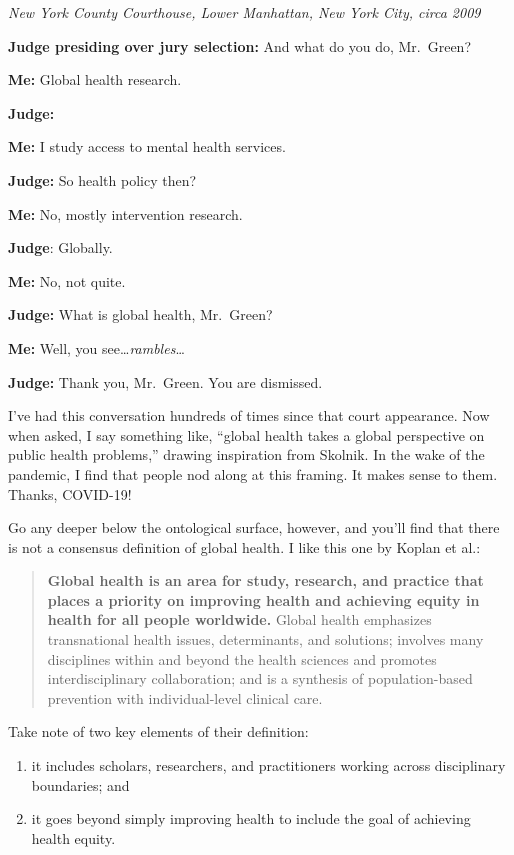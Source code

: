 \documentclass[justified,twoside,symmetric,]{tufte-book}
\providecommand{\tightlist}{%
  \setlength{\itemsep}{0pt}\setlength{\parskip}{0pt}}
\renewcommand*{\citep}[1]{{\cite{#1}}}
\begin{document}
\emph{New York County Courthouse, Lower Manhattan, New York City, circa 2009}

\textbf{Judge presiding over jury selection:} And what do you do, Mr.~Green?

\textbf{Me:} Global health research.

\textbf{Judge:}

\textbf{Me:} I study access to mental health services.

\textbf{Judge:} So health policy then?

\textbf{Me:} No, mostly intervention research.

\textbf{Judge}: Globally.

\textbf{Me:} No, not quite.

\textbf{Judge:} What is global health, Mr.~Green?

\textbf{Me:} Well, you see\ldots{}\emph{rambles}\ldots{}

\textbf{Judge:} Thank you, Mr.~Green. You are dismissed.

\vspace{2cm}

I've had this conversation hundreds of times since that court appearance. Now when asked, I say something like, ``global health takes a global perspective on public health problems,'' drawing inspiration from Skolnik.\citep{skolnik2019} In the wake of the pandemic, I find that people nod along at this framing. It makes sense to them. Thanks, COVID-19!

Go any deeper below the ontological surface, however, and you'll find that there is not a consensus definition of global health.\citep{merson:2018} I like this one by Koplan et al.\citep{koplan:2009}:

\begin{quote}
\textbf{Global health is an area for study, research, and practice that places a priority on improving health and achieving equity in health for all people worldwide.} Global health emphasizes transnational health issues, determinants, and solutions; involves many disciplines within and beyond the health sciences and promotes interdisciplinary collaboration; and is a synthesis of population-based prevention with individual-level clinical care.
\end{quote}

Take note of two key elements of their definition:

\begin{enumerate}
\def\labelenumi{\arabic{enumi}.}
\tightlist
\item
  it includes scholars, researchers, and practitioners working across disciplinary boundaries; and
\item
  it goes beyond simply improving health to include the goal of achieving health equity.
\end{enumerate}
\end{document}
